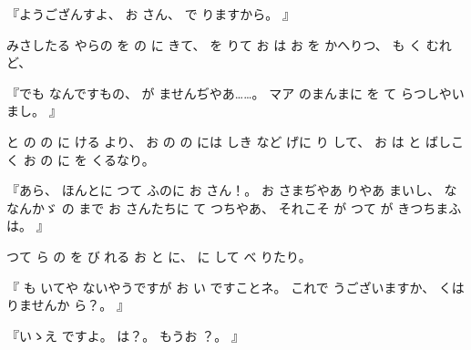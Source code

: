 
『ようござんすよ、
%
お
さん、
%
で
りますから。
』

みさしたる
やらの
を
の
に
きて、
%
を
りて
お
は
お
を
かへりつ、
%
も
く
むれど、

『でも
なんですもの、
%
が
ませんぢやあ……。
%
マア
のまんまに
を
て
らつしやいまし。
』

と
の
の
に
ける
より、
%
お
の
の
には
しき
など
げに
り
して、
%
お
は
と
ばしこく
お
の
に
を
くるなり。

『あら、
%
ほんとに
つて
ふのに
お
さん！。
%
お
さまぢやあ
りやあ
まいし、
%
な
なんかゞ
の
まで
お
さんたちに
て
つちやあ、
%
それこそ
が
つて
が
きつちまふは。
』

つて
ら
の
を
び
れる
お
と
に、
%
に
して
べ
りたり。

『
も
いてや
ないやうですが
お
い
ですことネ。
%
これで
うございますか、
%
くは
りませんか
ら？。
』

『いゝえ
ですよ。
%
は？。
%
もうお
？。
』

